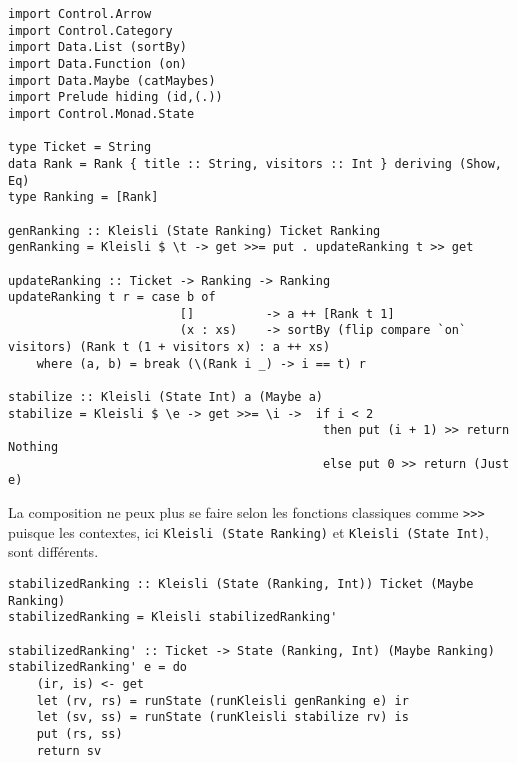 \documentclass{llncs}
\begin{document}




\begin{lstlisting}
import Control.Arrow
import Control.Category
import Data.List (sortBy)
import Data.Function (on)
import Data.Maybe (catMaybes)
import Prelude hiding (id,(.))
import Control.Monad.State

type Ticket = String
data Rank = Rank { title :: String, visitors :: Int } deriving (Show, Eq)
type Ranking = [Rank]

genRanking :: Kleisli (State Ranking) Ticket Ranking
genRanking = Kleisli $ \t -> get >>= put . updateRanking t >> get

updateRanking :: Ticket -> Ranking -> Ranking
updateRanking t r = case b of
                        []          -> a ++ [Rank t 1]
                        (x : xs)    -> sortBy (flip compare `on` visitors) (Rank t (1 + visitors x) : a ++ xs)
    where (a, b) = break (\(Rank i _) -> i == t) r

stabilize :: Kleisli (State Int) a (Maybe a)
stabilize = Kleisli $ \e -> get >>= \i ->  if i < 2
                                            then put (i + 1) >> return Nothing
                                            else put 0 >> return (Just e)
\end{lstlisting}

La composition ne peux plus se faire selon les fonctions classiques comme \lstinline{>>>}
puisque les contextes, ici \lstinline{Kleisli (State Ranking)} et \lstinline{Kleisli (State Int)},
sont différents.

\begin{lstlisting}
stabilizedRanking :: Kleisli (State (Ranking, Int)) Ticket (Maybe Ranking)
stabilizedRanking = Kleisli stabilizedRanking'

stabilizedRanking' :: Ticket -> State (Ranking, Int) (Maybe Ranking)
stabilizedRanking' e = do
    (ir, is) <- get
    let (rv, rs) = runState (runKleisli genRanking e) ir
    let (sv, ss) = runState (runKleisli stabilize rv) is
    put (rs, ss)
    return sv
\end{lstlisting}
\end{document}
